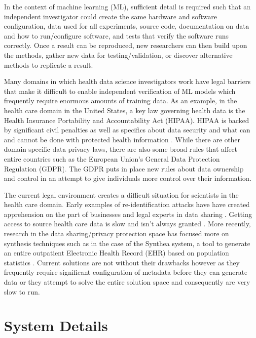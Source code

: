 \documentclass{amia}
\begin{document}
In the context of machine learning (ML), sufficient detail is required such that an independent investigator could create the same hardware and software configuration, data used for all experiments, source code, documentation on data and how to run/configure software, and tests that verify the software runs correctly. Once a result can be reproduced, new researchers can then build upon the methods, gather new data for testing/validation, or discover alternative methods to replicate a result.

Many domains in which health data science investigators work have legal barriers that make it difficult to enable independent verification of ML models which frequently require enormous amounts of training data. As an example, in the health care domain in the United States, a key law governing health data is the Health Insurance Portability and Accountability Act (HIPAA). HIPAA is backed by significant civil penalties as well as specifics about data security and what can and cannot be done with protected health information \cite{hippaviol}. While there are other domain specific data privacy laws, there are also some broad rules that affect entire countries such as the European Union's General Data Protection Regulation (GDPR). The GDPR puts in place new rules about data ownership and control in an attempt to give individuals more control over their information.

The current legal environment creates a difficult situation for scientists in the health care domain. Early examples of re-identification attacks \cite{sweeney_2002} have have created apprehension on the part of businesses and legal experts in data sharing \cite{ohm_broken_2009}. Getting access to source health care data is slow and isn't always granted \cite{hodge_legal_1999, committee_hipaa_privacy_rule_2009}. More recently, research in the data sharing/privacy protection space has focused more on synthesis techniques such as in the case of the Synthea system, a tool to generate an entire outpatient Electronic Health Record (EHR) based on population statistics \cite{walonoski_synthea_2018}. Current solutions are not without their drawbacks however as they frequently require significant configuration of metadata before they can generate data or they attempt to solve the entire solution space and consequently are very slow to run.

\section{System Details}
\end{document}
